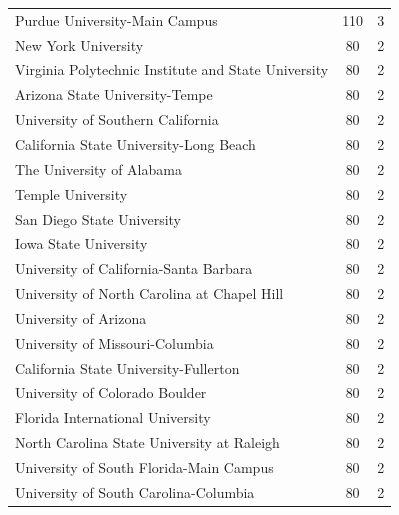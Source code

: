 \documentclass{mcmthesis}
\begin{document}
\begin{appendices}
\begin{tabular}{lcc}
        Purdue University-Main Campus&	110	&3\\
        New York University	&80	&2\\
        Virginia Polytechnic Institute and State University&	80&	2\\
        Arizona State University-Tempe	&80&	2\\
        University of Southern California	&80&	2\\
        California State University-Long Beach	&80&	2\\
        The University of Alabama	&80&	2\\
        Temple University	&80&	2\\
        San Diego State University	&80	&2\\
        Iowa State University	&80&	2\\
        University of California-Santa Barbara	&80&	2\\
        University of North Carolina at Chapel Hill&	80&	2\\
        University of Arizona	&80	&2\\
        University of Missouri-Columbia	&80	&2\\
        California State University-Fullerton	&80	&2\\
        University of Colorado Boulder	&80	&2\\
        Florida International University	&80&	2\\
        North Carolina State University at Raleigh	&80	&2\\
        University of South Florida-Main Campus&	80&	2\\
        University of South Carolina-Columbia	&80	&2\\\hline
    \end{tabular}
    

\end{appendices}
\end{document}
